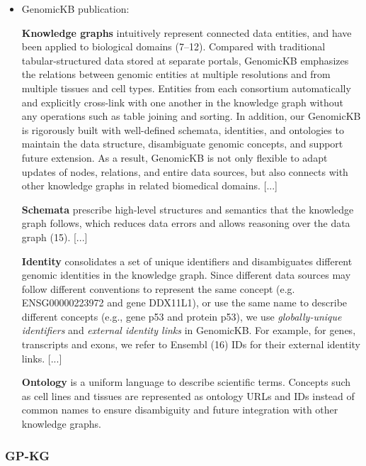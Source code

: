 \documentclass{article}
\begin{document}
\begin{itemize}

\item GenomicKB publication:
\begin{displayquote}
\textbf{Knowledge graphs} intuitively represent connected data entities, and have been applied to biological domains (7–12). Compared with traditional tabular-structured data stored at separate portals, GenomicKB emphasizes the relations between genomic entities at multiple resolutions and from multiple tissues and cell types. Entities from each consortium automatically and explicitly cross-link with one another in the knowledge graph without any operations such as table joining and sorting. In addition, our GenomicKB is rigorously built with well-defined schemata, identities, and ontologies to maintain the data structure, disambiguate genomic concepts, and support future extension. As a result, GenomicKB is not only flexible to adapt updates of nodes, relations, and entire data sources, but also connects with other knowledge graphs in related biomedical domains.
[...]

\textbf{Schemata} prescribe high-level structures and semantics that the knowledge graph follows, which reduces data errors and allows reasoning over the data graph (15).
[...]

\textbf{Identity} consolidates a set of unique identifiers and disambiguates different genomic identities in the knowledge graph. Since different data sources may follow different conventions to represent the same concept (e.g. ENSG00000223972 and gene DDX11L1), or use the same name to describe different concepts (e.g., gene p53 and protein p53), we use \textit{globally-unique identifiers} and \textit{external identity links} in GenomicKB. For example, for genes, transcripts and exons, we refer to Ensembl (16) IDs for their external identity links.
[...]

\textbf{Ontology} is a uniform language to describe scientific terms. Concepts such as cell lines and tissues are represented as ontology URLs and IDs instead of common names to ensure disambiguity and future integration with other knowledge graphs.
\end{displayquote}

\end{itemize}


\subsubsection{GP-KG}
\end{document}
